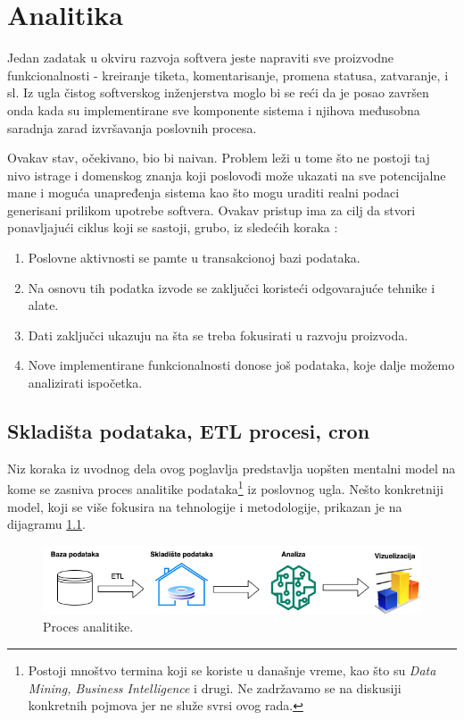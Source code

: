 \documentclass[12pt,oneside]{memoir}
\begin{document}
\chapter{Analitika}

Jedan zadatak u okviru razvoja softvera jeste napraviti sve proizvodne funkcionalnosti - kreiranje tiketa, komentarisanje, promena statusa, zatvaranje, i sl. Iz ugla čistog softverskog inženjerstva moglo bi se reći da je posao završen onda kada su implementirane sve komponente sistema i njihova međusobna saradnja zarad izvršavanja poslovnih procesa.

Ovakav stav, očekivano, bio bi naivan. Problem leži u tome što ne postoji taj nivo istrage i domenskog znanja koji poslovođi može ukazati na sve potencijalne mane i moguća unapređenja sistema kao što mogu uraditi realni podaci generisani prilikom upotrebe softvera. Ovakav pristup ima za cilj da stvori ponavljajući ciklus koji se sastoji, grubo, iz sledećih koraka \cite{dataanalytics}:
\begin{enumerate}
    \item Poslovne aktivnosti se pamte u transakcionoj bazi podataka.
    \item Na osnovu tih podatka izvode se zaključci koristeći odgovarajuće tehnike i alate.
    \item Dati zaključci ukazuju na šta se treba fokusirati u razvoju proizvoda.
    \item Nove implementirane funkcionalnosti donose još podataka, koje dalje možemo analizirati ispočetka.
\end{enumerate}

\section{Skladišta podataka, ETL procesi, cron}

Niz koraka iz uvodnog dela ovog poglavlja predstavlja uopšten mentalni model na kome se zasniva proces analitike podataka\footnote{Postoji mnoštvo termina koji se koriste u današnje vreme, kao što su \textit{Data Mining, Business Intelligence} i drugi. Ne zadržavamo se na diskusiji konkretnih pojmova jer ne služe svrsi ovog rada.} iz poslovnog ugla. Nešto konkretniji model, koji se više fokusira na tehnologije i metodologije, prikazan je na dijagramu \ref{fig:datadiag}.

\begin{figure}[h]
  \centering
  \includegraphics[width=1\textwidth]{docs/images/ch_5/datadiag.png} 
  \caption{Proces analitike.}
  \label{fig:datadiag}
\end{figure}
\end{document}
